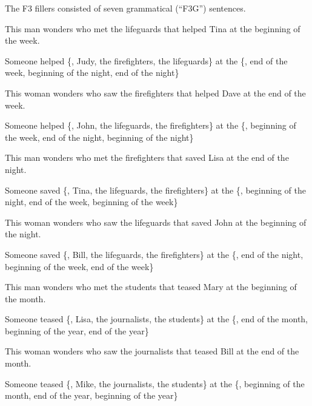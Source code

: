 \vspace{0.2cm}

The F3 fillers consisted of seven grammatical (``F3G'') sentences.

\vspace{0.2cm}

\pex %
\a[label=S] This man wonders who met the lifeguards that helped Tina at the beginning of the week.\par\nobreak
\a[label=Q] Someone helped \{, Judy, the firefighters, the lifeguards\} at the \{, end of the week, beginning of the night, end of the night\}
\xe

\pex %
\a[label=S] This woman wonders who saw the firefighters that helped Dave at the end of the week.\par\nobreak
\a[label=Q] Someone helped \{, John, the lifeguards, the firefighters\} at the \{, beginning of the week, end of the night, beginning of the night\}
\xe

\pex %
\a[label=S] This man wonders who met the firefighters that saved Lisa at the end of the night.\par\nobreak
\a[label=Q] Someone saved \{, Tina, the lifeguards, the firefighters\} at the \{, beginning of the night, end of the week, beginning of the week\}
\xe

\pex %
\a[label=S] This woman wonders who saw the lifeguards that saved John at the beginning of the night.\par\nobreak
\a[label=Q] Someone saved \{, Bill, the lifeguards, the firefighters\} at the \{, end of the night, beginning of the week, end of the week\}
\xe

\pex %
\a[label=S] This man wonders who met the students that teased Mary at the beginning of the month.\par\nobreak
\a[label=Q] Someone teased \{, Lisa, the journalists, the students\} at the \{, end of the month, beginning of the year, end of the year\}
\xe

\pex %
\a[label=S] This woman wonders who saw the journalists that teased Bill at the end of the month.\par\nobreak
\a[label=Q] Someone teased \{, Mike, the journalists, the students\} at the \{, beginning of the month, end of the year, beginning of the year\}
\xe

